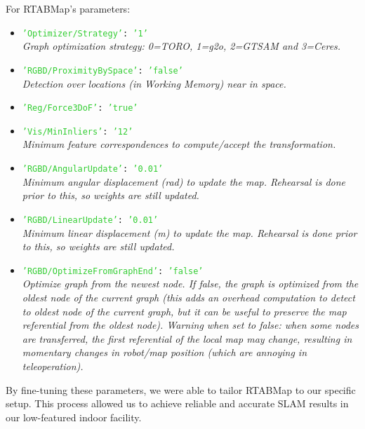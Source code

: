 For RTABMap's parameters:
\begin{itemize}
    \item \texttt{\textcolor{LimeGreen}{'Optimizer/Strategy'}: \textcolor{LimeGreen}{'1'}}\\
    \textit{Graph optimization strategy: 0=TORO, 1=g2o, 2=GTSAM and 3=Ceres.}
    \item \texttt{\textcolor{LimeGreen}{'RGBD/ProximityBySpace'}: \textcolor{LimeGreen}{'false'}}\\
    \textit{Detection over locations (in Working Memory) near in space.}
    \item \texttt{\textcolor{LimeGreen}{'Reg/Force3DoF'}: \textcolor{LimeGreen}{'true'}}
    \item \texttt{\textcolor{LimeGreen}{'Vis/MinInliers'}: \textcolor{LimeGreen}{'12'}}\\
    \textit{Minimum feature correspondences to compute/accept the transformation.}
    \item \texttt{\textcolor{LimeGreen}{'RGBD/AngularUpdate'}: \textcolor{LimeGreen}{'0.01'}}\\
    \textit{Minimum angular displacement (rad) to update the map. Rehearsal is done prior to this, so weights are still updated.}
    \item \texttt{\textcolor{LimeGreen}{'RGBD/LinearUpdate'}: \textcolor{LimeGreen}{'0.01'}}\\
    \textit{Minimum linear displacement (m) to update the map. Rehearsal is done prior to this, so weights are still updated.}
    \item \texttt{\textcolor{LimeGreen}{'RGBD/OptimizeFromGraphEnd'}: \textcolor{LimeGreen}{'false'}}\\
    \textit{Optimize graph from the newest node. If false, the graph is optimized from the oldest node of the current graph (this adds an overhead computation to detect to oldest node of the current graph, but it can be useful to preserve the map referential from the oldest node). Warning when set to false: when some nodes are transferred, the first referential of the local map may change, resulting in momentary changes in robot/map position (which are annoying in teleoperation).}
\end{itemize}

By fine-tuning these parameters, we were able to tailor RTABMap to our specific setup. This process allowed us to achieve reliable and accurate SLAM results in our low-featured indoor facility.
